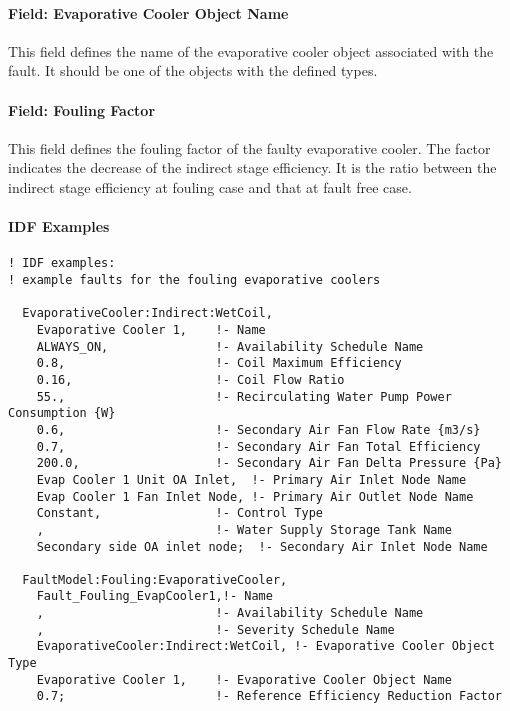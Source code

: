 \paragraph{Field: Evaporative Cooler Object Name}\label{field-evaporative cooler-object-name}

This field defines the name of the evaporative cooler object associated with the fault. It should be one of the objects with the defined types.

\paragraph{Field: Fouling Factor}\label{field-fouling-factor}

This field defines the fouling factor of the faulty evaporative cooler. The factor indicates the decrease of the indirect stage efficiency. It is the ratio between the indirect stage efficiency at fouling case and that at fault free case.

\paragraph{IDF Examples}

\begin{lstlisting}
! IDF examples:
! example faults for the fouling evaporative coolers

  EvaporativeCooler:Indirect:WetCoil,
    Evaporative Cooler 1,    !- Name
    ALWAYS_ON,               !- Availability Schedule Name
    0.8,                     !- Coil Maximum Efficiency
    0.16,                    !- Coil Flow Ratio
    55.,                     !- Recirculating Water Pump Power Consumption {W}
    0.6,                     !- Secondary Air Fan Flow Rate {m3/s}
    0.7,                     !- Secondary Air Fan Total Efficiency
    200.0,                   !- Secondary Air Fan Delta Pressure {Pa}
    Evap Cooler 1 Unit OA Inlet,  !- Primary Air Inlet Node Name
    Evap Cooler 1 Fan Inlet Node, !- Primary Air Outlet Node Name
    Constant,                !- Control Type
    ,                        !- Water Supply Storage Tank Name
    Secondary side OA inlet node;  !- Secondary Air Inlet Node Name

  FaultModel:Fouling:EvaporativeCooler,
    Fault_Fouling_EvapCooler1,!- Name
    ,                        !- Availability Schedule Name
    ,                        !- Severity Schedule Name
    EvaporativeCooler:Indirect:WetCoil, !- Evaporative Cooler Object Type
    Evaporative Cooler 1,    !- Evaporative Cooler Object Name
    0.7;                     !- Reference Efficiency Reduction Factor

\end{lstlisting}


